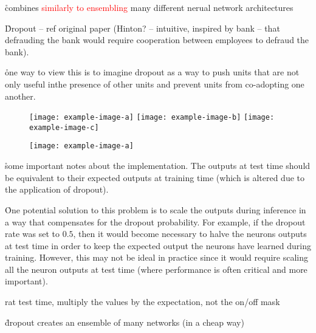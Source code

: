 \r{combines \textcolor{red}{similarly to ensembling} many different nerual network architectures}

\r{Dropout -- ref original paper (Hinton? -- intuitive, inspired by bank -- that defrauding the bank would require cooperation between employees to defraud the bank)}.


\r{one way to view this is to imagine dropout as a way to push units that are not only useful inthe presence of other units and prevent units from co-adopting one another.}


\begin{figure}[htp]
	\centering
	\texttt{[image: example-image-a]}\hfil
	\texttt{[image: example-image-b]}\hfil
	\texttt{[image: example-image-c]}\hfil
	\caption{}
	\label{fig:regularization_dropout_overview_training}
\end{figure}

\begin{figure}[htp]
	\centering
	\texttt{[image: example-image-a]}\hfil
	\caption{}
	\label{fig:regularization_dropout_overview_test}
\end{figure}

\r{some important notes about the implementation. The outputs at test time should be equivalent to their expected outputs at training time (which is altered due to the application of dropout).}

\r{One potential solution to this problem is to scale the outputs during inference in a way that compensates for the dropout probability.  For example, if the dropout rate was set to $0.5$, then it would become necessary to halve the neurons outputs at test time in order to keep the expected output the neurons have learned during training.  However, this may not be ideal in practice since it would require scaling all the neuron outputs at test time (where performance is often critical and more important).}

r{at test time, multiply the values by the expectation, not the on/off mask}

\r{dropout creates an ensemble of many networks (in a cheap way)}

